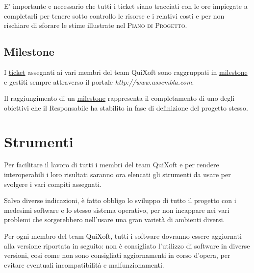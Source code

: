 \documentclass[11pt,a4paper]{article}
\begin{document}
E' importante e necessario che tutti i ticket siano tracciati con le ore impiegate a completarli per tenere sotto controllo le risorse e i relativi costi e per non rischiare di sforare le stime illustrate nel \textsc{Piano di Progetto}.
\subsection{Milestone}
I \underline{ticket} assegnati ai vari membri del team QuiXoft sono raggruppati in \underline{milestone} e gestiti sempre attraverso il portale \textit{http://www.assembla.com}.

Il raggiungimento di un \underline{milestone} rappresenta il completamento di uno degli obiettivi che il Responsabile ha stabilito in fase di definizione del progetto stesso.
\section{Strumenti}
Per facilitare il lavoro di tutti i membri del team QuiXoft e per rendere interoperabili i loro risultati saranno ora elencati gli strumenti da usare per svolgere i vari compiti assegnati.

Salvo diverse indicazioni, è fatto obbligo lo sviluppo di tutto il progetto con i medesimi software e lo stesso sistema operativo, per non incappare nei vari problemi che sorgerebbero nell'usare una gran varietà di ambienti diversi.

Per ogni membro del team QuiXoft, tutti i software dovranno essere aggiornati alla versione riportata in seguito: non è consigliato l'utilizzo di software in diverse versioni, cosi come non sono consigliati aggiornamenti in corso d'opera, per evitare eventuali incompatibilità e malfunzionamenti.
\end{document}
